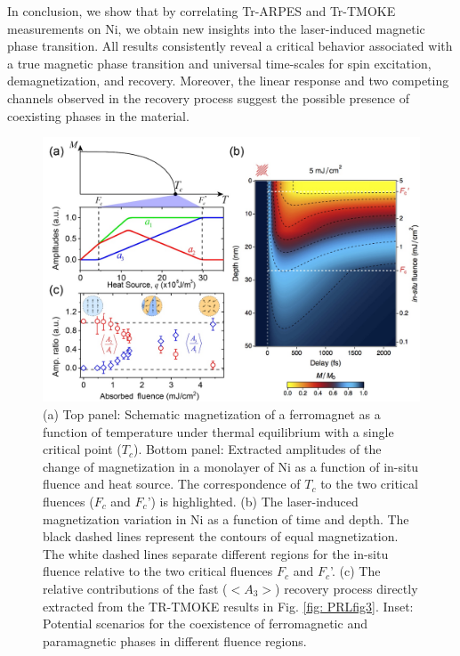 In conclusion, we show that by correlating Tr-ARPES and Tr-TMOKE measurements on Ni, we obtain new insights into the laser-induced magnetic phase transition. All results consistently reveal a critical behavior associated with a true magnetic phase transition and universal time-scales for spin excitation, demagnetization, and recovery. Moreover, the linear response and two competing channels observed in the recovery process suggest the possible presence of coexisting phases in the material.

\begin{figure}
\label{fig: PRLfig4}
\begin{center}
	\includegraphics[width=150mm]{figs/PRLFig4}
\end{center}
\caption{(a) Top panel: Schematic magnetization of a ferromagnet as a function of temperature under thermal equilibrium with a single critical point ($T_c$). Bottom panel: Extracted amplitudes of the change of magnetization in a monolayer of Ni as a function of in-situ fluence and heat source. The correspondence of $T_c$ to the two critical fluences ($F_c$ and $F_c$') is highlighted. (b) The laser-induced magnetization variation in Ni as a function of time and depth. The black dashed lines represent the contours of equal magnetization. The white dashed lines separate different regions for the in-situ fluence relative to the two critical fluences $F_c$ and $F_c$'. (c) The relative contributions of the fast ($<A_3>$) recovery process directly extracted from the TR-TMOKE results in Fig. \ref{fig: PRLfig3}. Inset: Potential scenarios for the coexistence of ferromagnetic and paramagnetic phases in different fluence regions.}
\end{figure}

